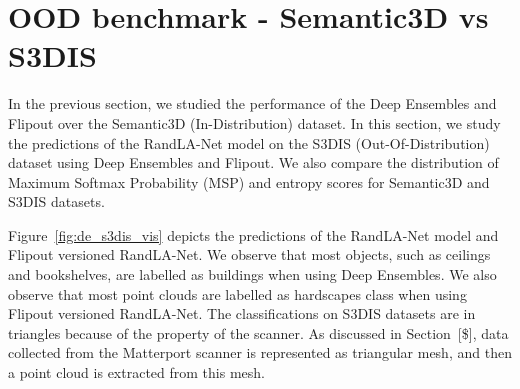     \section{OOD benchmark - Semantic3D vs S3DIS}
    In the previous section, we studied the performance of the Deep Ensembles and Flipout over the Semantic3D (In-Distribution) dataset.
    In this section, we study the predictions of the RandLA-Net model on the S3DIS (Out-Of-Distribution) dataset using Deep Ensembles and Flipout.
    We also compare the distribution of Maximum Softmax Probability (MSP) and entropy scores for Semantic3D and S3DIS datasets.

    Figure~\ref{fig:de_s3dis_vis} depicts the predictions of the RandLA-Net model and Flipout versioned RandLA-Net.
    We observe that most objects, such as ceilings and bookshelves, are labelled as buildings when using Deep Ensembles.
    We also observe that most point clouds are labelled as hardscapes class when using Flipout versioned RandLA-Net.
    The classifications on S3DIS datasets are in triangles because of the property of the scanner.
    As discussed in Section~[\$], data collected from the Matterport scanner is represented as triangular mesh, and then a point cloud is extracted from this mesh.

